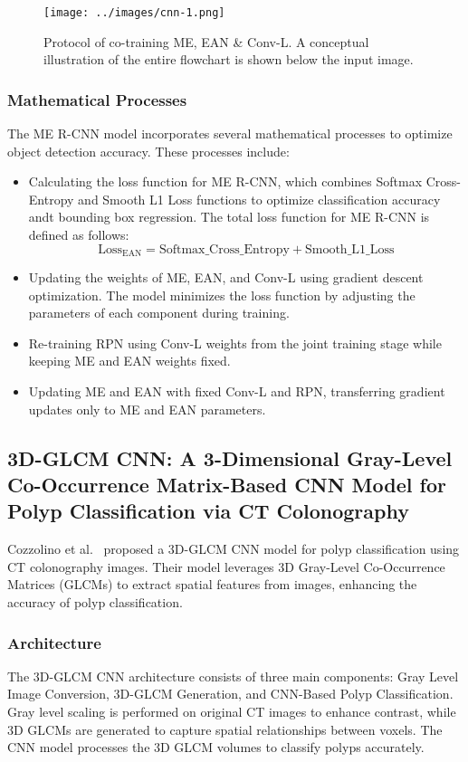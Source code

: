 \documentclass[journal, biblatex]{IEEEtran}
\begin{document}
\begin{figure*}[htbp]
    \centering
    \texttt{[image: ../images/cnn-1.png]}
    \caption{Protocol of co-training ME, EAN \& Conv-L. A conceptual illustration of the entire flowchart is shown below the input image.}
    \label{fig:me_rcnn}
\end{figure*}


\subsubsection{Mathematical Processes}
The ME R-CNN model incorporates several mathematical processes to optimize object detection accuracy. These processes include:
\begin{itemize}
    \item Calculating the loss function for ME R-CNN, which combines Softmax Cross-Entropy and Smooth L1 Loss functions to optimize classification accuracy andt bounding box regression. The total loss function for ME R-CNN is defined as follows:
    \[
    \text{Loss}_{\text{EAN}} = \text{Softmax\_Cross\_Entropy} + \text{Smooth\_L1\_Loss}
    \]
    
    \item Updating the weights of ME, EAN, and Conv-L using gradient descent optimization. The model minimizes the loss function by adjusting the parameters of each component during training.
    
    \item Re-training RPN using Conv-L weights from the joint training stage while keeping ME and EAN weights fixed.
    
    \item Updating ME and EAN with fixed Conv-L and RPN, transferring gradient updates only to ME and EAN parameters.
\end{itemize}

\subsection{3D-GLCM CNN: A 3-Dimensional Gray-Level Co-Occurrence Matrix-Based CNN Model for Polyp Classification via CT Colonography}
Cozzolino et al.~\cite{cozzolino2020} proposed a 3D-GLCM CNN model for polyp classification using CT colonography images. Their model leverages 3D Gray-Level Co-Occurrence Matrices (GLCMs) to extract spatial features from images, enhancing the accuracy of polyp classification.

\subsubsection{Architecture}
The 3D-GLCM CNN architecture consists of three main components: Gray Level Image Conversion, 3D-GLCM Generation, and CNN-Based Polyp Classification. Gray level scaling is performed on original CT images to enhance contrast, while 3D GLCMs are generated to capture spatial relationships between voxels. The CNN model processes the 3D GLCM volumes to classify polyps accurately.
\end{document}
